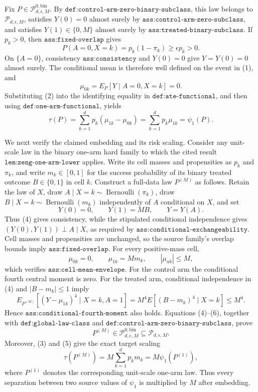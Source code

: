 Fix \(P\in\mathcal P^{0,\mathrm{bin}}_{d,\epsilon,M}\).  By
\(\texttt{def:control-arm-zero-binary-subclass}\), this law belongs to
\(\mathcal P_{d,\epsilon,M}\), satisfies
\(Y(0)=0\) almost surely by
\(\texttt{ass:control-arm-zero-subclass}\), and satisfies
\(Y(1)\in\{0,M\}\) almost surely by
\(\texttt{ass:treated-binary-subclass}\).  If \(p_k>0\), then
\(\texttt{ass:fixed-overlap}\) gives
\[
 P(A=0,X=k)=p_k(1-\pi_k)\ge \epsilon p_k>0.
\tag{1}
\]
On \(\{A=0\}\), consistency
\(\texttt{ass:consistency}\) and \(Y(0)=0\) give \(Y=Y(0)=0\)
almost surely.  The conditional mean is therefore well defined on the event
in (1), and
\[
 \mu_{0k}=E_P[Y\mid A=0,X=k]=0.
\tag{2}
\]
Substituting (2) into the identifying equality in
\(\texttt{def:ate-functional}\), and then using
\(\texttt{def:one-arm-functional}\), yields
\[
 \tau(P)
 =\sum_{k=1}^d p_k(\mu_{1k}-\mu_{0k})
 =\sum_{k=1}^d p_k\mu_{1k}
 =\psi_1(P).
\tag{3}
\]

We next verify the claimed embedding and its risk scaling.  Consider any
unit-scale law in the binary one-arm hard family to which the cited result
\(\texttt{lem:zeng-one-arm-lower}\) applies.  Write its cell masses and
propensities as \(p_k\) and \(\pi_k\), and write
\(m_k\in[0,1]\) for the success probability of its binary treated outcome
\(B\in\{0,1\}\) in cell \(k\).  Construct a full-data law
\(P^{(M)}\) as follows.  Retain the law of \(X\), draw
\(A\mid X=k\sim\operatorname{Bernoulli}(\pi_k)\), draw
\(B\mid X=k\sim\operatorname{Bernoulli}(m_k)\) independently of \(A\)
conditional on \(X\), and set
\[
 Y(0)=0,\qquad Y(1)=MB,
 \qquad Y=Y(A).
\tag{4}
\]
Thus (4) gives consistency, while the stipulated conditional independence
gives \((Y(0),Y(1))\perp A\mid X\), as required by
\(\texttt{ass:conditional-exchangeability}\).  Cell masses and propensities
are unchanged, so the source family's overlap bounds imply
\(\texttt{ass:fixed-overlap}\).  For every positive-mass cell,
\[
 \mu_{0k}=0,
 \qquad
 \mu_{1k}=Mm_k,
 \qquad
 |\mu_{ak}|\le M,
\tag{5}
\]
which verifies \(\texttt{ass:cell-mean-envelope}\).  For the control arm the
conditional fourth central moment is zero.  For the treated arm, conditional
independence in (4) and \(|B-m_k|\le1\) imply
\[
 E_{P^{(M)}}[(Y-\mu_{1k})^4\mid X=k,A=1]
 =M^4E[(B-m_k)^4\mid X=k]
 \le M^4.
\tag{6}
\]
Hence \(\texttt{ass:conditional-fourth-moment}\) also holds.  Equations
(4)--(6), together with \(\texttt{def:global-law-class}\) and
\(\texttt{def:control-arm-zero-binary-subclass}\), prove
\[
 P^{(M)}\in
 \mathcal P^{0,\mathrm{bin}}_{d,\epsilon,M}
 \subseteq\mathcal P_{d,\epsilon,M}.
\tag{7}
\]
Moreover, (3) and (5) give the exact target scaling
\[
 \tau(P^{(M)})
 =M\sum_{k=1}^d p_km_k
 =M\psi_1(P^{(1)}),
\tag{8}
\]
where \(P^{(1)}\) denotes the corresponding unit-scale one-arm law.  Thus
every separation between two source values of \(\psi_1\) is multiplied by
\(M\) after embedding.

